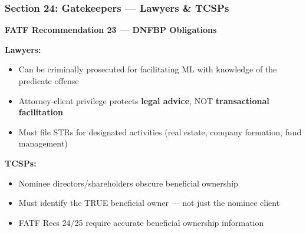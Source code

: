 \documentclass[12pt,aspectratio=169]{beamer}
\renewcommand{\scriptsize}{\fontsize{5}{6}\selectfont}
\begin{document}
	\begin{frame}
		\frametitle{\fontsize{13}{15}\selectfont \textbf{Section 24: Gatekeepers — Lawyers \& TCSPs}}
		\vspace{0.3cm}
		\begin{center}
			{\fontsize{12}{14}\selectfont \textbf{FATF Recommendation 23 — DNFBP Obligations}}
		\end{center}
		\vspace{0.2cm}
		\begin{block}{}
			\scriptsize
			\textbf{Lawyers:}
			\begin{itemize}
				\item Can be criminally prosecuted for facilitating ML with knowledge of the predicate offense
				\item Attorney-client privilege protects \textbf{legal advice}, NOT \textbf{transactional facilitation}
				\item Must file STRs for designated activities (real estate, company formation, fund management)
			\end{itemize}
			\vspace{0.1cm}
			\textbf{TCSPs:}
			\begin{itemize}
				\item Nominee directors/shareholders obscure beneficial ownership
				\item Must identify the TRUE beneficial owner — not just the nominee client
				\item FATF Recs 24/25 require accurate beneficial ownership information
			\end{itemize}
		\end{block}
	\end{frame}
	
\end{document}
